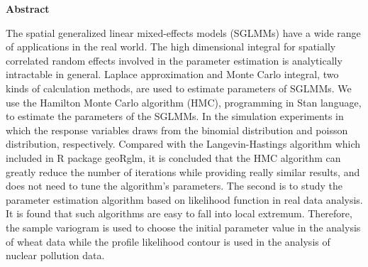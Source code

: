 \begin{center}
{\bf \Large Abstract}\\
\vskip 0.6cm
\end{center}
\par

The spatial generalized linear mixed-effects models (SGLMMs) have a wide range of applications in the real world. The high dimensional integral for spatially correlated random effects involved in the parameter estimation is analytically intractable in general. Laplace approximation and Monte Carlo integral, two kinds of calculation methods, are used to estimate parameters of SGLMMs. We use the Hamilton Monte Carlo algorithm (HMC), programming in Stan language, to estimate the parameters of the SGLMMs. In the simulation experiments in which the response variables draws from the binomial distribution and poisson distribution, respectively. Compared with the Langevin-Hastings algorithm which included in R package geoRglm, it is concluded that the HMC algorithm can greatly reduce the number of iterations while providing really similar results, and does not need to tune the algorithm's parameters. The second is to study the parameter estimation algorithm based on likelihood function in real data analysis. It is found that such algorithms are easy to fall into local extremum. Therefore, the sample variogram is used to choose the initial parameter value in the analysis of wheat data while the profile likelihood contour is used in the analysis of nuclear pollution data.



%  



